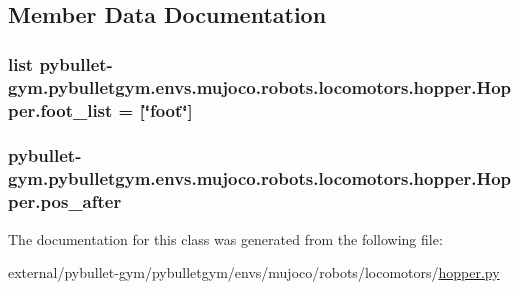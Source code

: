 \subsection{Member Data Documentation}
\subsubsection[{\texorpdfstring{foot\+\_\+list}{foot_list}}]{\setlength{\rightskip}{0pt plus 5cm}list pybullet-\/gym.\+pybulletgym.\+envs.\+mujoco.\+robots.\+locomotors.\+hopper.\+Hopper.\+foot\+\_\+list = \mbox{[}\char`\"{}foot\char`\"{}\mbox{]}\hspace{0.3cm}{\ttfamily [static]}}\hypertarget{classpybullet-gym_1_1pybulletgym_1_1envs_1_1mujoco_1_1robots_1_1locomotors_1_1hopper_1_1_hopper_ac383fc15806f386aa6eb2140ef0e0251}{}\label{classpybullet-gym_1_1pybulletgym_1_1envs_1_1mujoco_1_1robots_1_1locomotors_1_1hopper_1_1_hopper_ac383fc15806f386aa6eb2140ef0e0251}
\subsubsection[{\texorpdfstring{pos\+\_\+after}{pos_after}}]{\setlength{\rightskip}{0pt plus 5cm}pybullet-\/gym.\+pybulletgym.\+envs.\+mujoco.\+robots.\+locomotors.\+hopper.\+Hopper.\+pos\+\_\+after}\hypertarget{classpybullet-gym_1_1pybulletgym_1_1envs_1_1mujoco_1_1robots_1_1locomotors_1_1hopper_1_1_hopper_af39f936d615ed5381b2c4add99ed63cb}{}\label{classpybullet-gym_1_1pybulletgym_1_1envs_1_1mujoco_1_1robots_1_1locomotors_1_1hopper_1_1_hopper_af39f936d615ed5381b2c4add99ed63cb}


The documentation for this class was generated from the following file\+:\begin{DoxyCompactItemize}
\item 
external/pybullet-\/gym/pybulletgym/envs/mujoco/robots/locomotors/\hyperlink{mujoco_2robots_2locomotors_2hopper_8py}{hopper.\+py}\end{DoxyCompactItemize}
